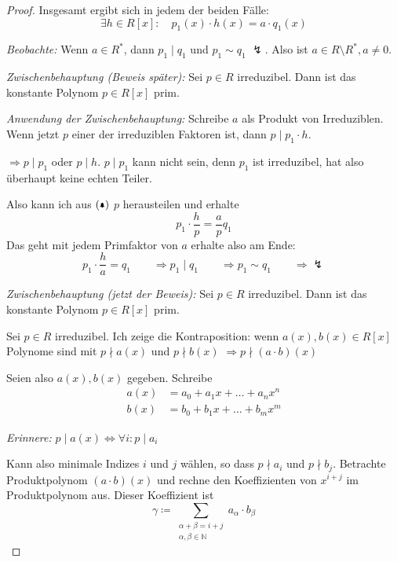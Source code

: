\documentclass[12pt,parskip=full]{scrartcl}
\newcommand{\setN}{\mathbb{N}}
\theoremstyle{definition}
\theoremstyle{remark}
\begin{document}
\begin{proof}
		Insgesamt ergibt sich in jedem der beiden Fälle:
		\begin{equation*}
			\exists h \in R[x]: \quad p_1(x) \cdot h(x) = a \cdot q_1(x) \tag{\bell}
		\end{equation*}
		
		\textit{Beobachte:} Wenn $a \in R^*$, dann $p_1 \mid q_1$ und $p_1 \sim q_1$ $\lightning$. Also ist $a \in R \setminus R^*, a \neq 0$.
		
		\textit{Zwischenbehauptung (Beweis später):} Sei $p \in R$ irreduzibel. Dann ist das konstante Polynom $p \in R[x]$ prim.
		
		\textit{Anwendung der Zwischenbehauptung:} Schreibe $a$ als Produkt von Irreduziblen. Wenn jetzt $p$ einer der irreduziblen Faktoren ist, dann $p \mid p_1 \cdot h$.
		
		$\Rightarrow p \mid p_1$ oder $p \mid h$. $p \mid p_1$ kann nicht sein, denn $p_1$ ist irreduzibel, hat also überhaupt keine echten Teiler.
		
		Also kann ich aus $(\bell)$ $p$ herausteilen und erhalte
		\begin{equation*}
			p_1 \cdot \frac{h}{p} = \frac{a}{p} q_1
		\end{equation*}
		Das geht mit jedem Primfaktor von $a$ erhalte also am Ende:
		\begin{equation*}
			p_1 \cdot \frac{h}{a} = q_1 \qquad\Rightarrow p_1 \mid q_1 \qquad\Rightarrow p_1 \sim q_1 \qquad\Rightarrow \lightning
		\end{equation*}
	
		\textit{Zwischenbehauptung (jetzt der Beweis):} Sei $p \in R$ irreduzibel. Dann ist das konstante Polynom $p \in R[x]$ prim.
		
		Sei $p \in R$ irreduzibel. Ich zeige die Kontraposition: wenn $a(x), b(x) \in R[x]$ Polynome sind mit $p \nmid a(x)$ und $p \nmid b(x)$ $\Rightarrow p \nmid (a \cdot b)(x)$
		
		Seien also $a(x), b(x)$ gegeben. Schreibe
		\begin{align*}
			a(x) &= a_0 + a_1 x + \dots + a_n x^n \\
			b(x) &= b_0 + b_1 x + \dots + b_m x^m
		\end{align*}
		
		\textit{Erinnere:} $p \mid a(x) \Leftrightarrow \forall i: p \mid a_i$
		
		Kann also minimale Indizes $i$ und $j$ wählen, so dass $p \nmid a_i$ und $p \nmid b_j$. Betrachte Produktpolynom $(a \cdot b)(x)$ und rechne den Koeffizienten von $x^{i+j}$ im Produktpolynom aus. Dieser Koeffizient ist
		\begin{equation*}
			\gamma \coloneqq \sum_{\substack{\alpha + \beta = i + j \\ \alpha, \beta \in \setN}} a_\alpha \cdot b_\beta
		\end{equation*}
		

\end{proof}
\end{document}
